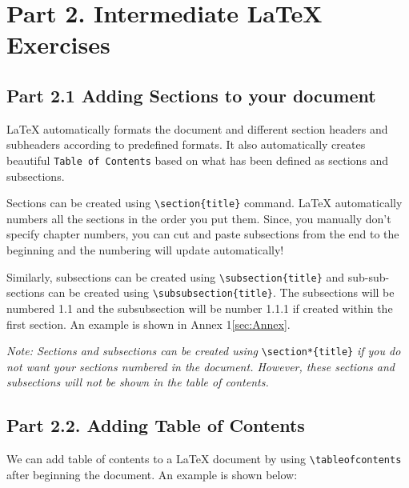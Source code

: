 \documentclass[12pts]{report}
\begin{document}
\section*{Part 2. Intermediate {\LaTeX} Exercises}
\subsection*{Part 2.1 Adding Sections to your document}
{\LaTeX} automatically formats the document and different section headers and subheaders according to predefined formats. It also automatically creates beautiful \texttt{Table of Contents} based on what has been defined as sections and subsections. 

Sections can be created using \verb|\section{title}| command. {\LaTeX} automatically numbers all the sections in the order you put them. Since, you manually don't specify chapter numbers, you can cut and paste subsections from the end to the beginning and the numbering will update automatically! 

Similarly, subsections can be created using \verb|\subsection{title}| and sub-sub-sections can be created using \verb|\subsubsection{title}|. The subsections will be numbered 1.1 and the subsubsection will be number 1.1.1 if created within the first section. An example is shown in Annex 1\ref{sec:Annex}. 

\textit{Note: Sections and subsections can be created using} \verb|\section*{title}| \textit{if you do not want your sections numbered in the document. However, these sections and subsections will not be shown in the table of contents.}

\subsection*{Part 2.2. Adding Table of Contents}

We can add table of contents to a {\LaTeX} document by using \verb|\tableofcontents| after beginning the document.  An example is shown below:
\end{document}
